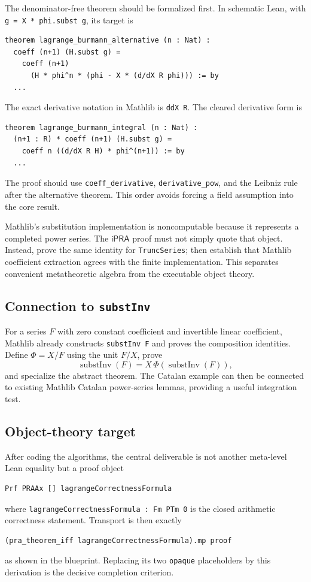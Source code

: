 \documentclass[11pt]{article}
\theoremstyle{definition}
\newcommand{\ipra}{\mathsf{iPRA}}
\newcommand{\code}[1]{\texttt{#1}}
\begin{document}
The denominator-free theorem should be formalized first.  In schematic Lean,
with \code{g = X * phi.subst g}, its target is
\begin{lstlisting}[language={}] 
theorem lagrange_burmann_alternative (n : Nat) :
  coeff (n+1) (H.subst g) =
    coeff (n+1)
      (H * phi^n * (phi - X * (d/dX R phi))) := by
  ...
\end{lstlisting}
The exact derivative notation in Mathlib is \code{d\textfractionsolidus dX R}.
The cleared derivative form is
\begin{lstlisting}[language={}]
theorem lagrange_burmann_integral (n : Nat) :
  (n+1 : R) * coeff (n+1) (H.subst g) =
    coeff n ((d/dX R H) * phi^(n+1)) := by
  ...
\end{lstlisting}
The proof should use \code{coeff\_derivative}, \code{derivative\_pow}, and the
Leibniz rule after the alternative theorem.  This order avoids forcing a field
assumption into the core result.

Mathlib's substitution implementation is noncomputable because it represents a
completed power series.  The \(\ipra\) proof must not simply quote that object.
Instead, prove the same identity for \code{TruncSeries}; then establish that
Mathlib coefficient extraction agrees with the finite implementation.  This
separates convenient metatheoretic algebra from the executable object theory.

\subsection{Connection to \code{substInv}}

For a series \(F\) with zero constant coefficient and invertible linear
coefficient, Mathlib already constructs \code{substInv F} and proves the
composition identities.  Define \(\Phi=X/F\) using the unit
\(F/X\), prove
\[
 \operatorname{substInv}(F)=X\,\Phi(\operatorname{substInv}(F)),
\]
and specialize the abstract theorem.  The Catalan example can then be connected
to existing Mathlib Catalan power-series lemmas, providing a useful integration
test.

\subsection{Object-theory target}

After coding the algorithms, the central deliverable is not another meta-level
Lean equality but a proof object
\begin{lstlisting}[language={}]
Prf PRAAx [] lagrangeCorrectnessFormula
\end{lstlisting}
where \code{lagrangeCorrectnessFormula : Fm PTm 0} is the closed arithmetic
correctness statement.  Transport is then exactly
\begin{lstlisting}[language={}]
(pra_theorem_iff lagrangeCorrectnessFormula).mp proof
\end{lstlisting}
as shown in the blueprint.  Replacing its two \code{opaque} placeholders by
this derivation is the decisive completion criterion.
\end{document}
